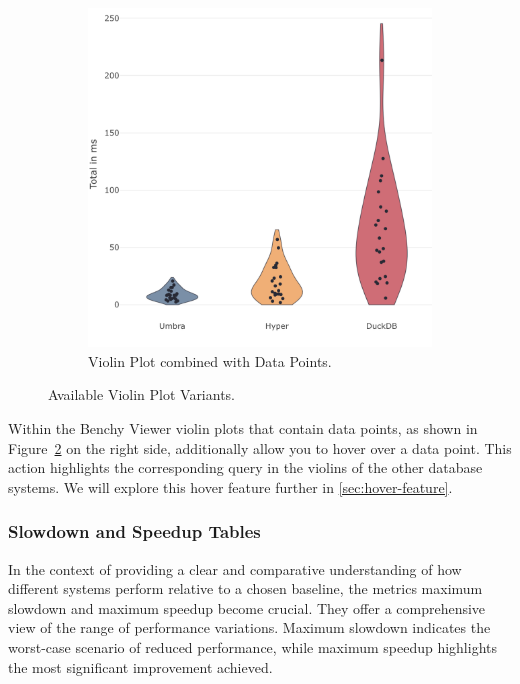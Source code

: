 \begin{figure}[h]
\begin{subfigure}[b]{0.4\linewidth}
    \includegraphics[width=\linewidth]{figures/bsp-violin-points.png}
    \caption{Violin Plot combined with Data Points.}
      \label{fig:app-violin-points}
  \end{subfigure}
  \caption{Available Violin Plot Variants.}
  \label{fig:violin-chart}
\end{figure}

Within the Benchy Viewer violin plots that contain data points, as shown in Figure~\ref{fig:violin-chart} on the right side, additionally allow you to hover over a data point. This action highlights the corresponding query in the violins of the other database systems. We will explore this hover feature further in \ref{sec:hover-feature}.


\subsubsection{Slowdown and Speedup Tables}\label{sec:tables}

In the context of providing a clear and comparative understanding of how different systems perform relative to a chosen baseline, the metrics maximum slowdown and maximum speedup become crucial. They offer a comprehensive view of the range of performance variations. Maximum slowdown indicates the worst-case scenario of reduced performance, while maximum speedup highlights the most significant improvement achieved.

